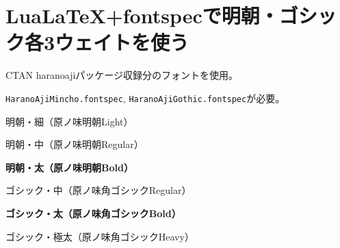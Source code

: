 \documentclass{ltjsarticle}
\begin{document}
\section{Lua\LaTeX +fontspecで明朝・ゴシック各3ウェイトを使う}

CTAN haranoajiパッケージ収録分のフォントを使用。

\texttt{HaranoAjiMincho.fontspec},
\texttt{HaranoAjiGothic.fontspec}が必要。

\vspace{\baselineskip}

\rmfamily
\mcfamily
{}\selectfont
明朝・細（原ノ味明朝Light）

\mdseries
明朝・中（原ノ味明朝Regular）

\bfseries
明朝・太（原ノ味明朝Bold）

\sffamily
\gtfamily
\mdseries
ゴシック・中（原ノ味角ゴシックRegular）

\bfseries
ゴシック・太（原ノ味角ゴシックBold）

\selectfont
ゴシック・極太（原ノ味角ゴシックHeavy）
\end{document}
